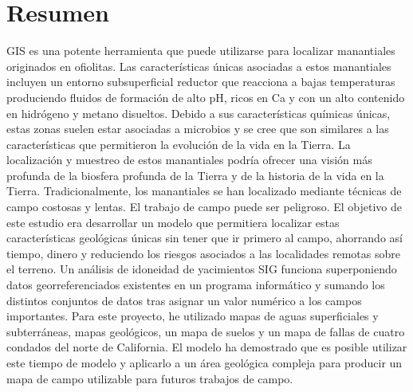 \chapter*{Resumen}
GIS es una potente herramienta que puede utilizarse para localizar manantiales originados en ofiolitas. Las características únicas asociadas a estos manantiales incluyen un entorno subsuperficial reductor que reacciona a bajas temperaturas produciendo fluidos de formación de alto pH, ricos en Ca y con un alto contenido en hidrógeno y metano disueltos. Debido a sus características químicas únicas, estas zonas suelen estar asociadas a microbios y se cree que son similares a las características que permitieron la evolución de la vida en la Tierra. La localización y muestreo de estos manantiales podría ofrecer una visión más profunda de la biosfera profunda de la Tierra y de la historia de la vida en la Tierra. Tradicionalmente, los manantiales se han localizado mediante técnicas de campo costosas y lentas. El trabajo de campo puede ser peligroso. El objetivo de este estudio era desarrollar un modelo que permitiera localizar estas características geológicas únicas sin tener que ir primero al campo, ahorrando así tiempo, dinero y reduciendo los riesgos asociados a las localidades remotas sobre el terreno. Un análisis de idoneidad de yacimientos SIG funciona superponiendo datos georreferenciados existentes en un programa informático y sumando los distintos conjuntos de datos tras asignar un valor numérico a los campos importantes. Para este proyecto, he utilizado mapas de aguas superficiales y subterráneas, mapas geológicos, un mapa de suelos y un mapa de fallas de cuatro condados del norte de California. El modelo ha demostrado que es posible utilizar este tiempo de modelo y aplicarlo a un área geológica compleja para producir un mapa de campo utilizable para futuros trabajos de campo.

